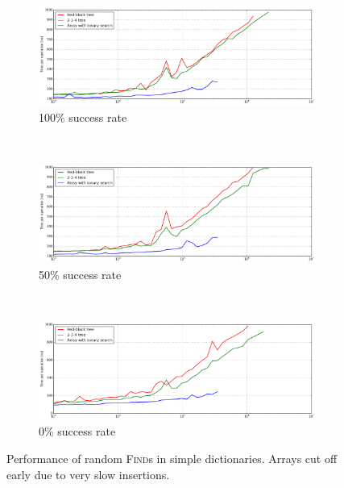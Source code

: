 \begin{figure}
\begin{subfigure}[t]{\textwidth}
	\includegraphics[width=\textwidth]{img/performance/basic-random-find-100}
	\caption{100\% success rate}
\end{subfigure}
\\
\begin{subfigure}[t]{\textwidth}
	\includegraphics[width=\textwidth]{img/performance/basic-random-find-50}
	\caption{50\% success rate}
\end{subfigure}
\\
\begin{subfigure}[t]{\textwidth}
	\includegraphics[width=\textwidth]{img/performance/basic-random-find-0}
	\caption{0\% success rate}
\end{subfigure}
\caption{Performance of random \textsc{Find}s in simple dictionaries.
	Arrays cut off early due to very slow insertions.}
\label{fig:basic-finds}
\end{figure}

